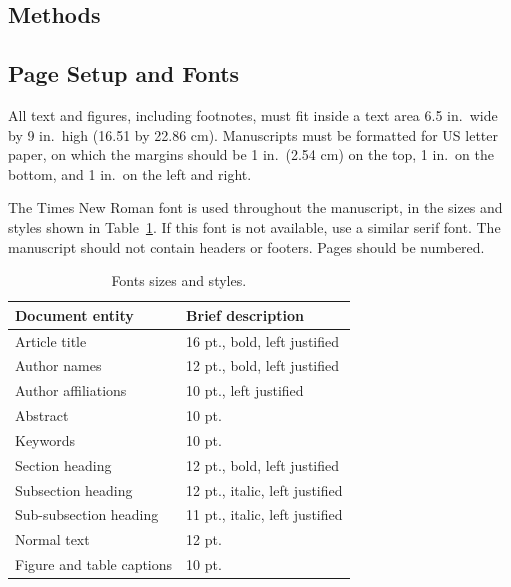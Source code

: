 \documentclass[12pt]{spieman}  %
\begin{document}
\begin{spacing}{2}
\section{Methods}

\subsection{Page Setup and Fonts}

All text and figures, including footnotes, must fit inside a text area 6.5 in.\ wide by 9 in.\ high (16.51 by 22.86 cm). Manuscripts must be formatted for US letter paper, on which the margins should be 1 in.\ (2.54 cm) on the top, 1 in.\ on the bottom, and 1 in.\ on the left and right.

The Times New Roman font is used throughout the manuscript, in the sizes and styles shown in Table~\ref{tab:fonts}. If this font is not available, use a similar serif font. The manuscript should not contain headers or footers. Pages should be numbered.

\begin{table}[ht]
\caption{Fonts sizes and styles.}
\label{tab:fonts}
\begin{center}
\begin{tabular}{|l|l|} %
\hline
\rule[-1ex]{0pt}{3.5ex}  Document entity & Brief description  \\
\hline\hline
\rule[-1ex]{0pt}{3.5ex}  Article title & 16 pt., bold, left justified  \\
\hline
\rule[-1ex]{0pt}{3.5ex}  Author names & 12 pt., bold, left justified   \\
\hline
\rule[-1ex]{0pt}{3.5ex}  Author affiliations & 10 pt., left justified   \\
\hline
\rule[-1ex]{0pt}{3.5ex}  Abstract & 10 pt.  \\
\hline
\rule[-1ex]{0pt}{3.5ex}  Keywords & 10 pt.  \\
\hline
\rule[-1ex]{0pt}{3.5ex}  Section heading & 12 pt., bold, left justified  \\
\hline
\rule[-1ex]{0pt}{3.5ex}  Subsection heading & 12 pt., italic, left justified  \\
\hline
\rule[-1ex]{0pt}{3.5ex}  Sub-subsection heading & 11 pt., italic, left justified  \\
\hline
\rule[-1ex]{0pt}{3.5ex}  Normal text & 12 pt. \\
\hline
\rule[-1ex]{0pt}{3.5ex}  Figure and table captions &  10 pt. \\
\hline
\end{tabular}
\end{center}
\end{table}


\end{spacing}
\end{document}
